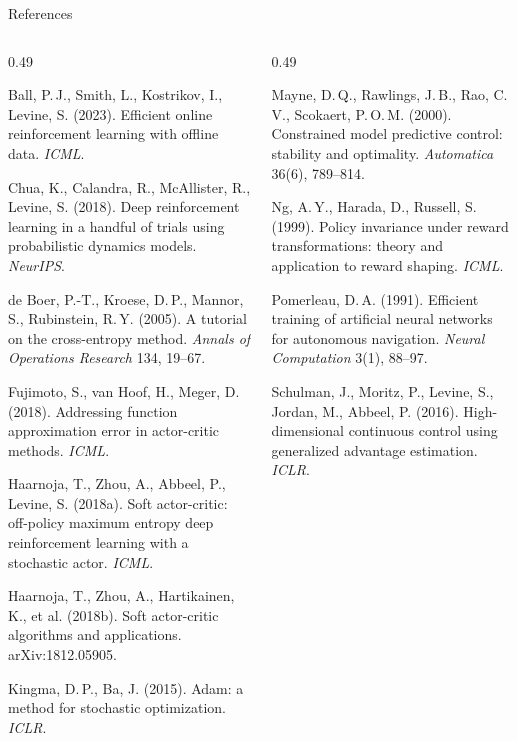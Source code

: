 \documentclass[aspectratio=169,11pt]{beamer}
\begin{document}
\begin{frame}{References}
  \begin{columns}[T]
    \begin{column}{0.49\textwidth}
      \tiny\raggedright\setlength{\parskip}{3pt}
      Ball, P.\,J., Smith, L., Kostrikov, I., Levine, S. (2023). Efficient online reinforcement learning with offline data. \emph{ICML}.\par
      Chua, K., Calandra, R., McAllister, R., Levine, S. (2018). Deep reinforcement learning in a handful of trials using probabilistic dynamics models. \emph{NeurIPS}.\par
      de Boer, P.-T., Kroese, D.\,P., Mannor, S., Rubinstein, R.\,Y. (2005). A tutorial on the cross-entropy method. \emph{Annals of Operations Research} 134, 19--67.\par
      Fujimoto, S., van Hoof, H., Meger, D. (2018). Addressing function approximation error in actor-critic methods. \emph{ICML}.\par
      Haarnoja, T., Zhou, A., Abbeel, P., Levine, S. (2018a). Soft actor-critic: off-policy maximum entropy deep reinforcement learning with a stochastic actor. \emph{ICML}.\par
      Haarnoja, T., Zhou, A., Hartikainen, K., et al. (2018b). Soft actor-critic algorithms and applications. arXiv:1812.05905.\par
      Kingma, D.\,P., Ba, J. (2015). Adam: a method for stochastic optimization. \emph{ICLR}.\par
    \end{column}
    \begin{column}{0.49\textwidth}
      \tiny\raggedright\setlength{\parskip}{3pt}
      Mayne, D.\,Q., Rawlings, J.\,B., Rao, C.\,V., Scokaert, P.\,O.\,M. (2000). Constrained model predictive control: stability and optimality. \emph{Automatica} 36(6), 789--814.\par
      Ng, A.\,Y., Harada, D., Russell, S. (1999). Policy invariance under reward transformations: theory and application to reward shaping. \emph{ICML}.\par
      Pomerleau, D.\,A. (1991). Efficient training of artificial neural networks for autonomous navigation. \emph{Neural Computation} 3(1), 88--97.\par
      Schulman, J., Moritz, P., Levine, S., Jordan, M., Abbeel, P. (2016). High-dimensional continuous control using generalized advantage estimation. \emph{ICLR}.\par

\end{column}
\end{columns}
\end{frame}
\end{document}
